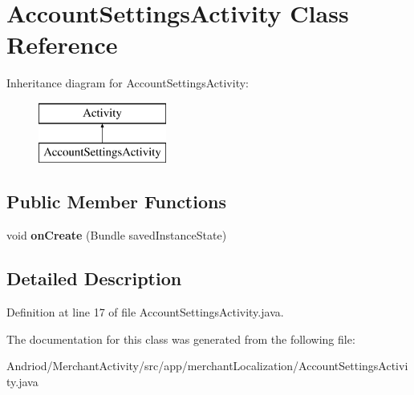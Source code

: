\hypertarget{classapp_1_1merchant_localization_1_1_account_settings_activity}{\section{Account\-Settings\-Activity Class Reference}
\label{classapp_1_1merchant_localization_1_1_account_settings_activity}
}
Inheritance diagram for Account\-Settings\-Activity\-:\begin{figure}[H]
\begin{center}
\leavevmode
\includegraphics[height=2.000000cm]{classapp_1_1merchant_localization_1_1_account_settings_activity}
\end{center}
\end{figure}
\subsection*{Public Member Functions}
\begin{DoxyCompactItemize}
\item 
\hypertarget{classapp_1_1merchant_localization_1_1_account_settings_activity_a85e87cb5ced88dff7c8173ecc4f636d1}{void {\bfseries on\-Create} (Bundle saved\-Instance\-State)}\label{classapp_1_1merchant_localization_1_1_account_settings_activity_a85e87cb5ced88dff7c8173ecc4f636d1}

\end{DoxyCompactItemize}


\subsection{Detailed Description}


Definition at line 17 of file Account\-Settings\-Activity.\-java.



The documentation for this class was generated from the following file\-:\begin{DoxyCompactItemize}
\item 
Andriod/\-Merchant\-Activity/src/app/merchant\-Localization/Account\-Settings\-Activity.\-java\end{DoxyCompactItemize}
